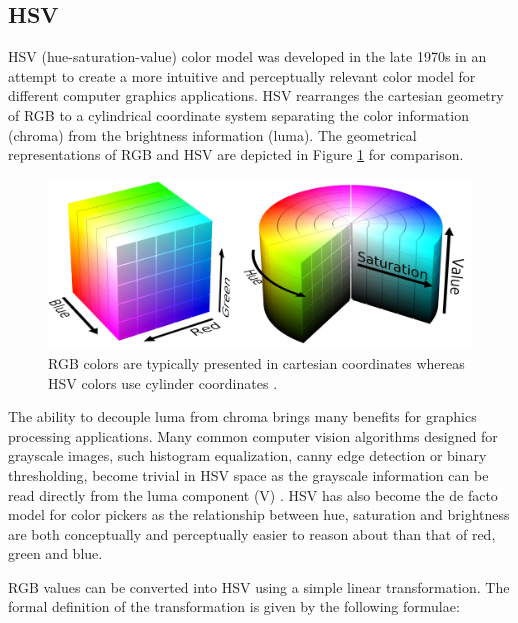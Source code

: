 \documentclass[thesis.tex]{subfiles}
\begin{document}
\subsection{HSV}

HSV (hue-saturation-value) color model was developed in the late 1970s in an attempt to create a more intuitive and perceptually relevant color model for different computer graphics applications. HSV rearranges the cartesian geometry of RGB to a cylindrical coordinate system separating the color information (chroma) from the brightness information (luma). The geometrical representations of RGB and HSV are depicted in Figure \ref{figure:rgb_hsv} for comparison.

\begin{figure}[ht]
\centering \includegraphics[width=\textwidth]{images/rgb_hsv}
\caption{RGB colors are typically presented in cartesian coordinates whereas HSV colors use cylinder coordinates \cite{hsv_cylinder}\cite{rgb_cube}.\label{figure:rgb_hsv}}
\end{figure}

The ability to decouple luma from chroma brings many benefits for graphics processing applications. Many common computer vision algorithms designed for grayscale images, such histogram equalization, canny edge detection or binary thresholding, become trivial in HSV space as the grayscale information can be read directly from the luma component (V) \cite{color_segmentation}. HSV has also become the de facto model for color pickers as the relationship between hue, saturation and brightness are both conceptually and perceptually easier to reason about than that of red, green and blue.

RGB values can be converted into HSV using a simple linear transformation. The formal definition of the transformation is given by the following formulae:
\end{document}
